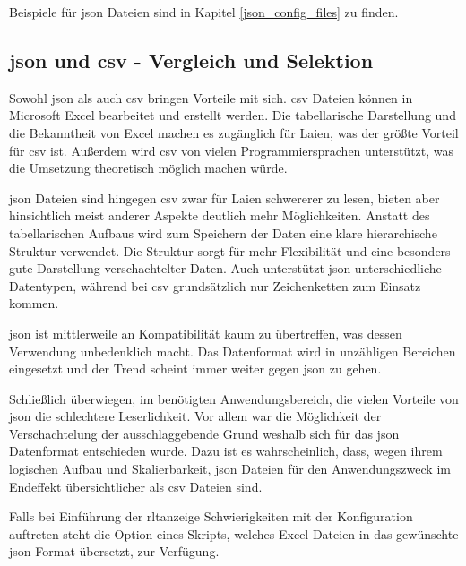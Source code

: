 Beispiele für \acs{json} Dateien sind in Kapitel \ref{json_config_files} zu finden.

\subsection{\acs{json} und \acs{csv} - Vergleich und Selektion} \label{json_vs_csv}
Sowohl \acs{json} als auch \acs{csv} bringen Vorteile mit sich. 
\acs{csv} Dateien können in Microsoft Excel bearbeitet und erstellt werden. Die tabellarische Darstellung und die Bekanntheit von Excel machen es zugänglich für Laien, was der größte Vorteil für \acs{csv} ist. Außerdem wird \acs{csv} von vielen Programmiersprachen unterstützt, was die Umsetzung theoretisch möglich machen würde. 

\acs{json} Dateien sind hingegen \acs{csv} zwar für Laien schwererer zu lesen, bieten aber hinsichtlich meist anderer Aspekte deutlich mehr Möglichkeiten. Anstatt des tabellarischen Aufbaus wird zum Speichern der Daten eine klare hierarchische Struktur verwendet. Die Struktur sorgt für mehr Flexibilität und eine besonders gute Darstellung verschachtelter Daten. Auch unterstützt \acs{json} unterschiedliche Datentypen, während bei \acs{csv} grundsätzlich nur Zeichenketten zum Einsatz kommen.

\acs{json} ist mittlerweile an Kompatibilität kaum zu übertreffen, was dessen Verwendung unbedenklich macht. Das Datenformat wird in unzähligen Bereichen eingesetzt und der Trend scheint immer weiter gegen \acs{json} zu gehen.

Schließlich überwiegen, im benötigten Anwendungsbereich, die vielen Vorteile von \acs{json} die schlechtere Leserlichkeit. Vor allem war die Möglichkeit der Verschachtelung der ausschlaggebende Grund weshalb sich für das \acs{json} Datenformat entschieden wurde. Dazu ist es wahrscheinlich, dass, wegen ihrem logischen Aufbau und  Skalierbarkeit, \acs{json} Dateien für den Anwendungszweck im Endeffekt übersichtlicher als \acs{csv} Dateien sind.

Falls bei Einführung der \acs{rltanzeige} Schwierigkeiten mit der Konfiguration auftreten steht \zB die Option eines Skripts, welches Excel Dateien in das gewünschte \acs{json} Format übersetzt, zur Verfügung.


